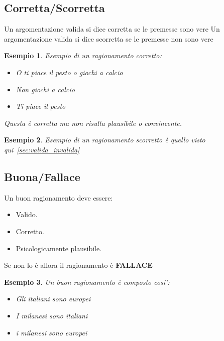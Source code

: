 \documentclass[../main.tex, class=article, 12pt]{subfiles}
\newtheorem{exmp}{Esempio}[section]
\theoremstyle{definition}
\begin{document}
\subsection{Corretta/Scorretta}\label{sec:corretta_scorretta}
Un argomentazione valida si dice corretta se le premesse sono vere \newline
Un argomentazione valida si dice scorretta se le premesse non sono vere \newline
\begin{exmp}
        Esempio di un ragionamento corretto:
        \begin{itemize}
                \item O ti piace il pesto o giochi a calcio
                \item Non giochi a calcio
                \item Ti piace il pesto
        \end{itemize}
        Questa è corretta ma non risulta plausibile o convincente.
\end{exmp}
\begin{exmp}
        Esempio di un ragionamento scorretto è quello visto qui~\ref{sec:valida_invalida}
\end{exmp}



\subsection{Buona/Fallace}
Un buon ragionamento deve essere:
\begin{itemize}
        \item Valido.
        \item Corretto.
        \item Psicologicamente plausibile.
\end{itemize}
Se non lo è allora il ragionamento è \textbf{FALLACE} 
\begin{exmp}
        Un buon ragionamento è composto cosi':
        \begin{itemize}
                \item Gli italiani sono europei
                \item I milanesi sono italiani
                \item i milanesi sono europei
        \end{itemize}
\end{exmp}
\end{document}
